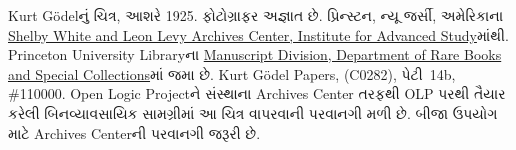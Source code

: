Kurt G\"odelનું ચિત્ર, આશરે 1925. ફોટોગ્રાફર અજ્ઞાત છે.
પ્રિન્સ્ટન, ન્યૂ જર્સી, અમેરિકાના
\href{https://library.ias.edu/archives}{Shelby White and Leon Levy Archives Center,
Institute for Advanced Study}માંથી. Princeton University Libraryના
\href{http://rbsc.princeton.edu/divisions/manuscripts-division}{Manuscript Division,
Department of Rare Books and Special Collections}માં જમા છે. Kurt G\"odel Papers,
(C0282), પેટી~14b, \#110000. Open Logic Projectને સંસ્થાના Archives Center તરફથી
OLP પરથી તૈયાર કરેલી બિનવ્યાવસાયિક સામગ્રીમાં આ ચિત્ર વાપરવાની પરવાનગી મળી છે.
બીજા ઉપયોગ માટે Archives Centerની પરવાનગી જરૂરી છે.
